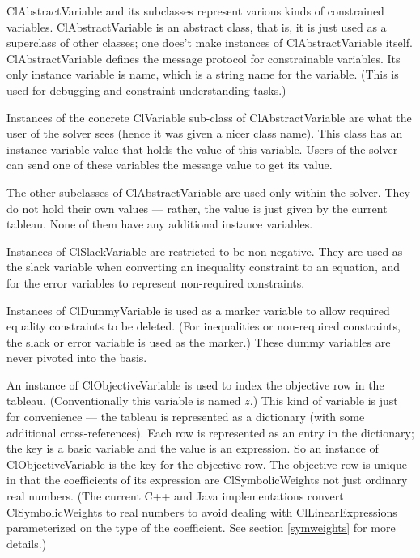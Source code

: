 \documentclass{article}
\begin{document}
{\sf ClAbstractVariable} and its subclasses represent various kinds of
constrained variables.  {\sf ClAbstractVariable} is an abstract class, that
is, it is just used as a superclass of other classes; one does't make
instances of {\sf ClAbstractVariable} itself.  {\sf ClAbstractVariable}
defines the message protocol for constrainable variables.  Its only
instance variable is {\sf name}, which is a string name for the variable.
(This is used for debugging and constraint understanding tasks.)

Instances of the concrete {\sf ClVariable} sub-class of {\sf
  ClAbstractVariable} are what the user of the solver sees (hence
it was given a nicer class name).  This class has an instance variable
{\sf value} that holds the value of this variable.  Users of the solver can
send one of these variables the message {\sf value} to get its value.

The other subclasses of {\sf ClAbstractVariable} are used only within the
solver.  They do not hold their own values --- rather, the value is just
given by the current tableau.  None of them have any additional instance
variables.

Instances of {\sf ClSlackVariable} are restricted to be non-negative.  They
are used as the slack variable when converting an inequality constraint to
an equation, and for the error variables to represent non-required constraints.

Instances of {\sf ClDummyVariable} is used as a marker variable to allow
required equality constraints to be deleted.  (For inequalities or
non-required constraints, the slack or error variable is used as the
marker.)  These dummy variables are never pivoted into the basis.

An instance of {\sf ClObjectiveVariable} is used to index the objective row
in the tableau.  (Conventionally this variable is named $z$.)  This kind of
variable is just for convenience --- the tableau is represented as a
dictionary (with some additional cross-references).  Each row is
represented as an entry in the dictionary; the key is a basic variable and
the value is an expression.  So an instance of {\sf ClObjectiveVariable} is
the key for the objective row.  The objective row is unique in that the
coefficients of its expression are {\sf ClSymbolicWeight}s not just
ordinary real numbers. (The current C++ and Java implementations convert {\sf
  ClSymbolicWeight}s to real numbers to avoid dealing with {\sf
  ClLinearExpression}s parameterized on the type of the coefficient.
See section \ref{symweights} for more details.)
\end{document}
